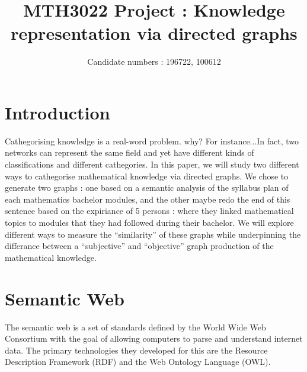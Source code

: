\documentclass[english, 12pt]{article}
\title{MTH3022 Project : Knowledge representation via directed graphs} %
\author{Candidate numbers : 196722, 100612}
\date{}
\begin{document}
\maketitle
\section{Introduction}
Cathegorising knowledge is a real-word problem. {\color{red} why? For instance...}In fact, two networks can represent the same field and yet have different kinds of classifications and different cathegories. In this paper, we will study two different ways to cathegorise mathematical knowledge via directed graphs. We chose to generate two graphs : one based on a semantic analysis of the syllabus plan of each mathematics bachelor modules, and the other {\color{red} maybe redo the end of this sentence} based on the expiriance of 5 persons : where they linked mathematical topics to modules that they had followed during their bachelor. We will explore different ways to measure the ``similarity'' of these graphs while underpinning the differance between a ``subjective'' and ``objective'' graph production of the mathematical knowledge.

\section{Semantic Web}
The semantic web is a set of standards defined by the World Wide Web Consortium\cite{w3c_website} with the goal of allowing computers to parse and understand internet data. The primary technologies they developed for this are the Resource Description Framework\cite{w3c_rdf} (RDF) and the Web Ontology Language\cite{w3c_owl} (OWL).
\end{document}
